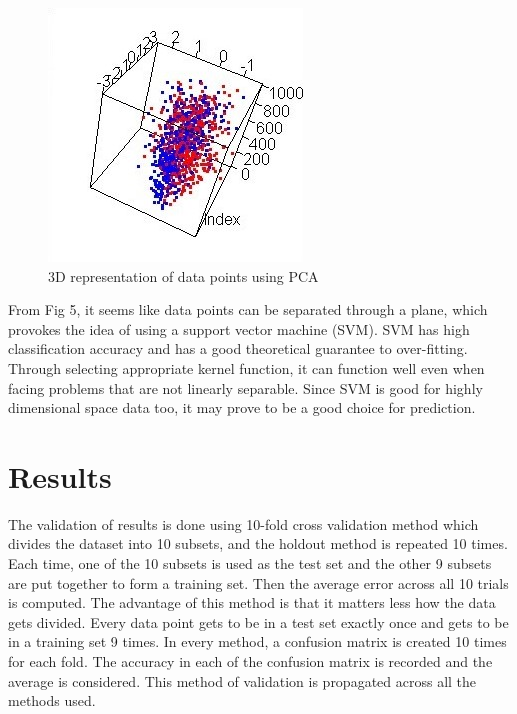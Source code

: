 \documentclass[conference]{IEEEtran}
\begin{document}
\begin{itemize}
\begin{figure}[!t]
\includegraphics[width=\linewidth]{tab5}
\caption{3D representation of data points using PCA}
\end{figure}

 From Fig 5, it seems like data points can be separated through a plane, which provokes the idea of using a support vector machine (SVM). SVM has high classification accuracy and has a good theoretical guarantee to over-fitting. Through selecting appropriate kernel function, it can function well even when facing problems that are not linearly separable. Since SVM is good for highly dimensional space data too, it may prove to be a good choice for prediction.

\end{itemize}

\section{Results}

The validation of results is done using 10-fold cross validation method which divides the dataset into 10 subsets, and the holdout method is repeated 10 times. Each time, one of the 10 subsets is used as the test set and the other 9 subsets are put together to form a training set. Then the average error across all 10 trials is computed. The advantage of this method is that it matters less how the data gets divided. Every data point gets to be in a test set exactly once and gets to be in a training set 9 times. In every method, a confusion matrix is created 10 times for each fold. The accuracy in each of the confusion matrix is recorded and the average is considered. This method of validation is propagated across all the methods used.
\end{document}
